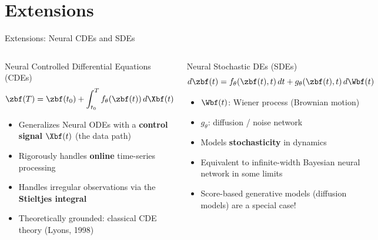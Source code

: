 \documentclass[aspectratio=169,xcolor=dvipsnames,svgnames,x11names,fleqn]{beamer}
\begin{document}
\section{Extensions}
 
\begin{frame}{Extensions: Neural CDEs and SDEs}
\scriptsize

\begin{columns}
\begin{tblockFrost}{Neural Controlled Differential Equations (CDEs)}
$$
  \zbf(T) = \zbf(t_0) + \int_{t_0}^T f_\theta(\zbf(t))\, d\Xbf(t)
$$
\begin{itemize}
  \item Generalizes Neural ODEs with a \textbf{control signal} $\Xbf(t)$ (the data path)
  \item Rigorously handles \textbf{online} time-series processing
  \item Handles irregular observations via the \textbf{Stieltjes integral}
  \item Theoretically grounded: classical CDE theory (Lyons, 1998)
\end{itemize}
\end{tblockFrost}
\begin{tblockFrost}{Neural Stochastic DEs (SDEs)}
$$
  d\zbf(t) = f_\theta(\zbf(t),t)\,dt + g_\theta(\zbf(t),t)\,d\Wbf(t)
$$
\begin{itemize}
  \item $\Wbf(t)$: Wiener process (Brownian motion)
  \item $g_\theta$: diffusion / noise network
  \item Models \textbf{stochasticity} in dynamics
  \item Equivalent to infinite-width Bayesian neural network in some limits
  \item Score-based generative models (diffusion models) are a special case!
\end{itemize}
\end{tblockFrost}
\end{columns}
\end{frame}
 
\end{document}
